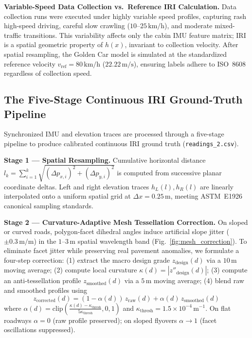 \documentclass[conference]{IEEEtran}
\begin{document}
\textbf{Variable-Speed Data Collection vs.\ Reference IRI Calculation.}
Data collection runs were executed under highly variable speed profiles, capturing rash high-speed driving, careful slow crawling ($10$--$25\,\text{km/h}$), and moderate mixed-traffic transitions. This variability affects only the cabin IMU feature matrix; IRI is a spatial geometric property of $h(x)$, invariant to collection velocity. After spatial resampling, the Golden Car model is simulated at the standardized reference velocity $v_{\text{ref}} = 80\,\text{km/h}$ ($22.22\,\text{m/s}$), ensuring labels adhere to ISO~8608 regardless of collection speed.

\subsection{The Five-Stage Continuous IRI Ground-Truth Pipeline}
Synchronized IMU and elevation traces are processed through a five-stage pipeline to produce calibrated continuous IRI ground truth (\texttt{readings\_2.csv}).

\textbf{Stage 1 — Spatial Resampling.}
Cumulative horizontal distance $l_k = \sum_{i=1}^{k} \sqrt{(\Delta p_{x,i})^2 + (\Delta p_{y,i})^2}$ is computed from successive planar coordinate deltas. Left and right elevation traces $h_L(l), h_R(l)$ are linearly interpolated onto a uniform spatial grid at $\Delta x = 0.25\,\text{m}$, meeting ASTM~E1926 canonical sampling standards.

\textbf{Stage 2 — Curvature-Adaptive Mesh Tessellation Correction.}
On sloped or curved roads, polygon-facet dihedral angles induce artificial slope jitter ($\pm 0.3\,\text{m/m}$) in the $1$--$3\,\text{m}$ spatial wavelength band (Fig.~\ref{fig:mesh_correction}). To eliminate facet jitter while preserving real pavement anomalies, we formulate a four-step correction: (1) extract the macro design grade $z_{\text{design}}(d)$ via a $10\,\text{m}$ moving average; (2) compute local curvature $\kappa(d) = |z''_{\text{design}}(d)|$; (3) compute an anti-tessellation profile $z_{\text{smoothed}}(d)$ via a $5\,\text{m}$ moving average; (4) blend raw and smoothed profiles using
\begin{equation}
z_{\text{corrected}}(d) = (1 - \alpha(d))\,z_{\text{raw}}(d) + \alpha(d)\,z_{\text{smoothed}}(d)
\end{equation}
where $\alpha(d) = \text{clip}\!\left(\tfrac{\kappa(d) - \kappa_{\text{thresh}}}{5\kappa_{\text{thresh}}}, 0, 1\right)$ and $\kappa_{\text{thresh}} = 1.5\times10^{-4}\,\text{m}^{-1}$. On flat roadways $\alpha = 0$ (raw profile preserved); on sloped flyovers $\alpha \to 1$ (facet oscillations suppressed).
\end{document}
